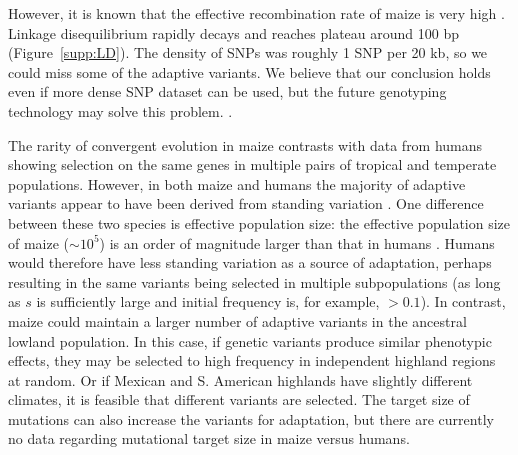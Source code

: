 \label{low power}
However, it is known that the effective recombination rate of maize is very high \cite[]{Tenaillon_2001_11470895}.
Linkage disequilibrium rapidly decays and reaches plateau around 100 bp (Figure~\ref{supp:LD}).
The density of SNPs was roughly 1 SNP per 20 kb, so we could miss some of the adaptive variants.
We believe that our conclusion holds even if more dense SNP dataset can be used, but the future genotyping technology may solve this problem.
\cite[]{tiffin2014advances}.

\label{other taxa}
The rarity of convergent evolution in maize contrasts with data from humans \citep{Tennessen_2011_21698142} showing selection on the same genes in multiple pairs of tropical and temperate populations.  
However, in both maize and humans the majority of adaptive variants appear to have been derived from standing variation \cite[]{Tennessen_2011_21698142}.
One difference between these two species is effective population size: the effective population size of maize ($\sim10^5$) is an order of magnitude larger than that in humans \cite[]{Takahata_1997_9114074}.
Humans would therefore have less standing variation as a source of adaptation, perhaps resulting in the same variants being selected in multiple subpopulations (as long as $s$ is sufficiently large and initial frequency is, for example, $>0.1$).
In contrast, maize could maintain a larger number of adaptive variants in the ancestral lowland population.
In this case, if genetic variants produce similar phenotypic effects, they may be selected to high frequency in independent highland regions at random.
Or if Mexican and S. American highlands have slightly different climates, it is feasible that different variants are selected.
The target size of mutations can also increase the variants for adaptation, but there are currently no data regarding mutational target size in maize versus humans.
 


\label{other explanations}
